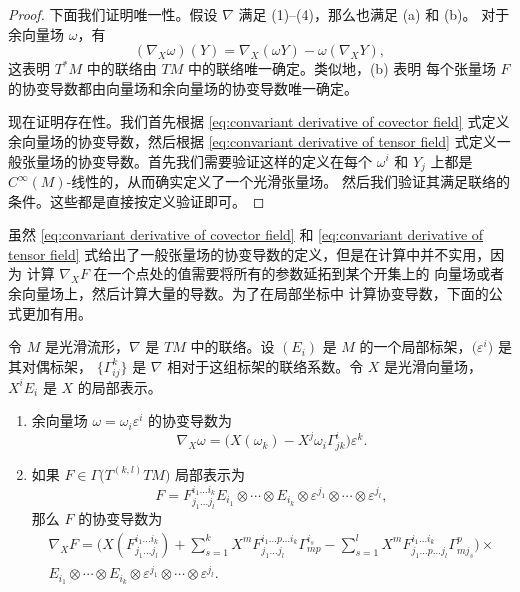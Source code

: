 \documentclass[fontset=none]{Notes}
\begin{document}
\begin{proof}
  下面我们证明唯一性。假设 $\nabla$ 满足 (1)--(4)，那么也满足 (a) 和 (b)。
  对于余向量场 $\omega$，有
  \begin{equation}\label{eq:convariant derivative of covector field}
    (\nabla_X\omega)(Y)=\nabla_X(\omega Y)-\omega(\nabla_XY),
  \end{equation}
  这表明 $T^*M$ 中的联络由 $TM$ 中的联络唯一确定。类似地，(b) 表明
  每个张量场 $F$ 的协变导数都由向量场和余向量场的协变导数唯一确定。

  现在证明存在性。我们首先根据 \eqref{eq:convariant derivative of covector field}
  式定义余向量场的协变导数，然后根据 \eqref{eq:convariant derivative of tensor field} 
  式定义一般张量场的协变导数。首先我们需要验证这样的定义在每个 $\omega^i$
  和 $Y_j$ 上都是 $C^\infty(M)$-线性的，从而确实定义了一个光滑张量场。
  然后我们验证其满足联络的条件。这些都是直接按定义验证即可。
\end{proof}

虽然 \eqref{eq:convariant derivative of covector field} 和 \eqref{eq:convariant derivative of tensor field}
式给出了一般张量场的协变导数的定义，但是在计算中并不实用，因为
计算 $\nabla_XF$ 在一个点处的值需要将所有的参数延拓到某个开集上的
向量场或者余向量场上，然后计算大量的导数。为了在局部坐标中
计算协变导数，下面的公式更加有用。

\begin{proposition}
  令 $M$ 是光滑流形，$\nabla$ 是 $TM$ 中的联络。设 $(E_i)$
  是 $M$ 的一个局部标架，$\bigl(\varepsilon^i\bigr)$ 是其对偶标架，
  $\{\Gamma_{ij}^k\}$ 是 $\nabla$ 相对于这组标架的联络系数。令 $X$
  是光滑向量场，$X^iE_i$ 是 $X$ 的局部表示。
  \begin{enumerate}
    \item 余向量场 $\omega=\omega_i\varepsilon^i$ 的协变导数为
    \[
      \nabla_X\omega=\bigl(X(\omega_k)-X^j\omega_i\Gamma_{jk}^i\bigr)  \varepsilon^k.
    \]
    \item 如果 $F\in\Gamma\bigl(T^{(k,l)}TM\bigr)$ 局部表示为
    \[
      F=F^{i_1\dots i_k}_{j_1\dots j_l}E_{i_1}\otimes
      \cdots\otimes E_{i_k}\otimes\varepsilon^{j_1}\otimes\cdots\otimes\varepsilon^{j_l},
    \]
    那么 $F$ 的协变导数为
    \begin{multline*}
      \nabla_XF=\biggl(X\left(F^{i_1\dots i_k}_{j_1\dots j_l}\right)+
      \sum_{s=1}^kX^m F^{i_1\dots p\dots i_k}_{j_1\dots j_l}\Gamma_{mp}^{i_s}-
      \sum_{s=1}^lX^mF^{i_1\dots i_k}_{j_1\dots p\dots j_l}\Gamma_{mj_s}^p\biggr)\times\\
      E_{i_1}\otimes
      \cdots\otimes E_{i_k}\otimes\varepsilon^{j_1}\otimes\cdots\otimes\varepsilon^{j_l}.
    \end{multline*}
  \end{enumerate}
\end{proposition}
\end{document}
